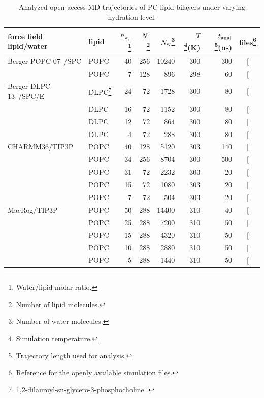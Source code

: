 \documentclass[journal=jcisd8,manuscript=article,layout=twocolumn]{achemso}
\begin{document}
\begin{table}[]
\caption{Analyzed open-access MD trajectories of PC lipid bilayers under varying hydration level.}
\begin{minipage}[t]{\columnwidth}
\resizebox{\columnwidth}{!} {
\begin{tabular}{llrrrrrc}
force field lipid/water &
lipid  &
$n_{{\mathrm w\!}_{/\mathrm l}}$\footnote{Water/lipid molar ratio.}  &
$N_{\rm l}$\footnote{Number of lipid molecules.}  &
$N_{\rm w}$\footnote{Number of water molecules.} &
$T$\footnote{Simulation temperature.}(K)  &
$t_{{\rm anal}}$\footnote{Trajectory length used for analysis.}(ns) &
files\footnote{Reference for the openly available simulation files.} \tabularnewline
\hline 
Berger-POPC-07~\cite{ollila07a}/SPC\cite{berendsen81}
	& POPC & 40 & 256 & 10240 & 300 & 300  & {[}\!\!\citenum{bergerFILESpopcT300}{]} \tabularnewline		
	& POPC  & 7  & 128  & 896  & 298  & 60  & {[}\!\!\citenum{bergerDEHYDfiles}{]} \tabularnewline

Berger-DLPC-13~\cite{kanduc13}/SPC/E\cite{berendsen87}
	& DLPC\footnote{1,2-dilauroyl-sn-glycero-3-phosphocholine. \label{fn:DLPC}}  & 24  & 72  & 1728  & 300  & 80  & {[}\!\!\citenum{bergerFILESdlpc24}{]} \tabularnewline
	& DLPC\footref{fn:DLPC}  & 16  & 72  & 1152  & 300  & 80  & {[}\!\!\citenum{bergerFILESdlpc16}{]} \tabularnewline
	& DLPC\footref{fn:DLPC}  & 12  & 72  & 864  & 300  & 80  & {[}\!\!\citenum{bergerFILESdlpc12}{]} \tabularnewline
	& DLPC\footref{fn:DLPC}  & 4  & 72  & 288  & 300  & 80  & {[}\!\!\citenum{bergerFILESdlpc4}{]} \tabularnewline[1.0ex]
	
CHARMM36\cite{klauda10}/TIP3P\cite{mackerell98}
	& POPC  & 40  & 128  & 5120  & 303  & 140 & {[}\!\!\citenum{charmm36files}{]} \tabularnewline
	& POPC  & 34	&  256  & 8704 & 300 & 500  & {[}\!\!\citenum{macrogfilesT300}{]}\tabularnewline
	& POPC  & 31 & 72 & 2232 & 303 & 20 & {[}\!\!\citenum{charmm36files31wPERl}{]}\tabularnewline
	& POPC  & 15  & 72  & 1080  & 303  & 20  & {[}\!\!\citenum{charmm36files15wPERl}{]} \tabularnewline
	& POPC  & 7  & 72  & 504  & 303  & 20  & {[}\!\!\citenum{charmm36files7wPERl}{]} \tabularnewline[1.0ex]
MacRog\cite{kulig15}/TIP3P\cite{Jorgensen:1983a}
	& POPC  & 50  & 288  & 14400  & 310  & 40  & {[}\!\!\citenum{macrogdehydFILES}{]} \tabularnewline
	& POPC  & 25  & 288  & 7200  & 310  & 50  & {[}\!\!\citenum{macrogdehydFILES}{]} \tabularnewline	
	& POPC  & 15  & 288  & 4320  & 310  & 50 & {[}\!\!\citenum{macrogdehydFILES}{]} \tabularnewline
	& POPC  & 10  & 288  & 2880  & 310  & 50  & {[}\!\!\citenum{macrogdehydFILES}{]} \tabularnewline
	& POPC  & 5  & 288  & 1440  & 310  & 50  & {[}\!\!\citenum{macrogdehydFILES}{]} \tabularnewline
\end{tabular}
}
\label{tab:hydr}
\end{minipage}

\end{table}
\end{document}
